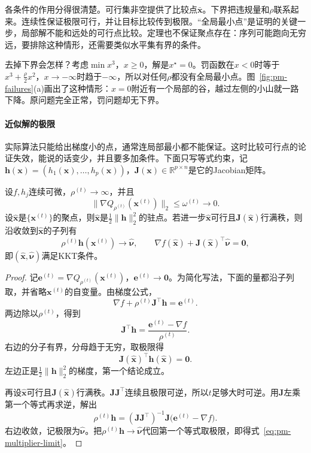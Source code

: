 各条件的作用分得很清楚。可行集非空提供了比较点$\bar{\bm{x}}$。下界把违规量和$\rho$联系起来。连续性保证极限可行，并让目标比较传到极限。“全局最小点”是证明的关键一步，局部解不能和远处的可行点比较。定理也不保证聚点存在：序列可能跑向无穷远，要排除这种情形，还需要类似水平集有界的条件。

去掉下界会怎样？考虑$\min x^3$，$x\geq0$，解是$x^\star=0$。罚函数在$x<0$时等于$x^3+\tfrac\rho2x^2$，$x\to-\infty$时趋于$-\infty$，所以对任何$\rho$都没有全局最小点。图~\ref{fig:pm-failures}(a)画出了这种情形：$x=0$附近有一个局部的谷，越过左侧的小山就一路下降。原问题完全正常，罚问题却无下界。

\paragraph{近似解的极限}
实际算法只能给出梯度小的点，通常连局部最小都不能保证。这时比较可行点的论证失效，能说的话变少，并且要多加条件。下面只写等式约束，记$\bm{h}(\bm{x})=(h_1(\bm{x}),\ldots,h_p(\bm{x}))$，$\bm{J}(\bm{x})\in\mathbb{R}^{p\times n}$是它的Jacobian矩阵。

\begin{theorem}[近似驻点的极限]
\label{thm:pm-quadratic-approximate}
设$f,h_j$连续可微，$\rho^{(t)}\to\infty$，并且
\begin{equation}
 \lVert\nabla Q_{\rho^{(t)}}(\bm{x}^{(t)})\rVert_2\leq\omega^{(t)}\to0 .
 \label{eq:pm-inner-accuracy}
\end{equation}
设$\hat{\bm{x}}$是$\{\bm{x}^{(t)}\}$的聚点，则$\hat{\bm{x}}$是$\tfrac12\lVert\bm{h}\rVert_2^2$的驻点。若进一步$\hat{\bm{x}}$可行且$\bm{J}(\hat{\bm{x}})$行满秩，则沿收敛到$\hat{\bm{x}}$的子列有
\begin{equation}
 \rho^{(t)}\bm{h}(\bm{x}^{(t)})\to\hat{\bm{\nu}},\qquad
 \nabla f(\hat{\bm{x}})+\bm{J}(\hat{\bm{x}})^\top\hat{\bm{\nu}}=\bm{0},
 \label{eq:pm-multiplier-limit}
\end{equation}
即$(\hat{\bm{x}},\hat{\bm{\nu}})$满足KKT条件。
\end{theorem}

\begin{proof}
记$\bm{e}^{(t)}=\nabla Q_{\rho^{(t)}}(\bm{x}^{(t)})$，$\bm{e}^{(t)}\to\bm{0}$。为简化写法，下面的量都沿子列取，并省略$\bm{x}^{(t)}$的自变量。由梯度公式，
\[
 \nabla f+\rho^{(t)}\bm{J}^\top\bm{h}=\bm{e}^{(t)}.
\]
两边除以$\rho^{(t)}$，得到
\[
 \bm{J}^\top\bm{h}=\frac{\bm{e}^{(t)}-\nabla f}{\rho^{(t)}}.
\]
右边的分子有界，分母趋于无穷，取极限得
\[
 \bm{J}(\hat{\bm{x}})^\top\bm{h}(\hat{\bm{x}})=\bm{0}.
\]
左边正是$\tfrac12\lVert\bm{h}\rVert_2^2$的梯度，第一个结论成立。

再设$\hat{\bm{x}}$可行且$\bm{J}(\hat{\bm{x}})$行满秩。$\bm{J}\bm{J}^\top$连续且极限可逆，所以$t$足够大时可逆。用$\bm{J}$左乘第一个等式再求逆，解出
\[
 \rho^{(t)}\bm{h}=(\bm{J}\bm{J}^\top)^{-1}\bm{J}\bigl(\bm{e}^{(t)}-\nabla f\bigr).
\]
右边收敛，记极限为$\hat{\bm{\nu}}$。把$\rho^{(t)}\bm{h}\to\hat{\bm{\nu}}$代回第一个等式取极限，即得式~\eqref{eq:pm-multiplier-limit}。
\end{proof}

